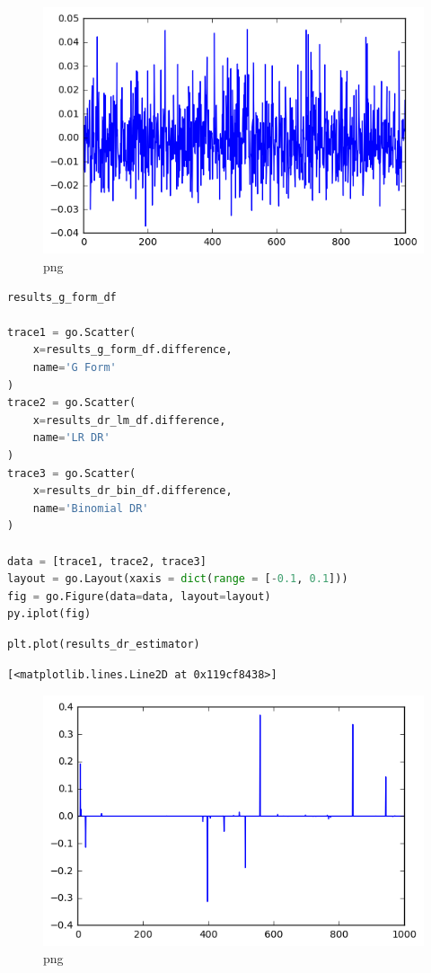 \begin{figure}
\centering
\includegraphics{Final Iteration_files/Final Iteration_36_1.png}
\caption{png}
\end{figure}

\begin{lstlisting}[language=Python]
results_g_form_df

trace1 = go.Scatter(
    x=results_g_form_df.difference,
    name='G Form'
)
trace2 = go.Scatter(
    x=results_dr_lm_df.difference,
    name='LR DR'
)
trace3 = go.Scatter(
    x=results_dr_bin_df.difference,
    name='Binomial DR'
)

data = [trace1, trace2, trace3]
layout = go.Layout(xaxis = dict(range = [-0.1, 0.1]))
fig = go.Figure(data=data, layout=layout)
py.iplot(fig)
\end{lstlisting}

\begin{lstlisting}[language=Python]
plt.plot(results_dr_estimator)
\end{lstlisting}

\begin{lstlisting}
[<matplotlib.lines.Line2D at 0x119cf8438>]
\end{lstlisting}

\begin{figure}
\centering
\includegraphics{Final Iteration_files/Final Iteration_38_1.png}
\caption{png}
\end{figure}

\begin{lstlisting}[language=Python]
\end{lstlisting}

\begin{lstlisting}[language=Python]
\end{lstlisting}

